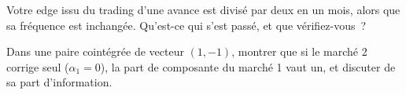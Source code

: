 \begin{interviewq}\label{iq:hf:lead-lag-and-cross-venue-trading:5}
Votre edge issu du trading d'une avance est divisé par deux en un mois, alors que sa fréquence est inchangée. Qu'est-ce qui s'est passé, et que vérifiez-vous~?
\end{interviewq}

\begin{interviewq}\label{iq:hf:lead-lag-and-cross-venue-trading:6}
Dans une paire cointégrée de vecteur $(1,-1)$, montrer que si le marché 2 corrige seul ($\alpha_1=0$), la part de composante du marché 1 vaut un, et discuter de sa
part d'information.
\end{interviewq}
